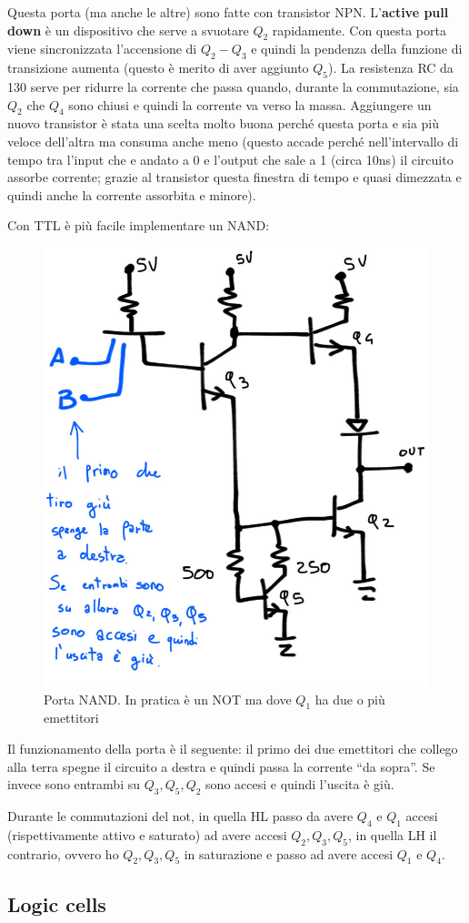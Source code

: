 \documentclass[
]{book}
\begin{document}
Questa porta (ma anche le altre) sono fatte con transistor NPN.
L'\textbf{active pull down} è un dispositivo che serve a svuotare
\(Q_{2}\) rapidamente. Con questa porta viene sincronizzata l'accensione
di \(Q_{2}-Q_{3}\) e quindi la pendenza della funzione di transizione
aumenta (questo è merito di aver aggiunto \(Q_{5}\)). La resistenza RC
da 130 serve per ridurre la corrente che passa quando, durante la
commutazione, sia \(Q_{2}\) che \(Q_{4}\) sono chiusi e quindi la
corrente va verso la massa. Aggiungere un nuovo transistor è stata una
scelta molto buona perché questa porta e sia più veloce dell'altra ma
consuma anche meno (questo accade perché nell'intervallo di tempo tra
l'input che e andato a 0 e l'output che sale a 1 (circa 10ns) il
circuito assorbe corrente; grazie al transistor questa finestra di tempo
e quasi dimezzata e quindi anche la corrente assorbita e minore).

Con TTL è più facile implementare un NAND:

\begin{figure}
\centering
\includegraphics[width=0.3\linewidth,height=\textheight,keepaspectratio]{immagini/23.jpg}
\caption{Porta NAND. In pratica è un NOT ma dove \(Q_1\) ha due o più
emettitori}
\end{figure}

Il funzionamento della porta è il seguente: il primo dei due emettitori
che collego alla terra spegne il circuito a destra e quindi passa la
corrente ``da sopra''. Se invece sono entrambi su \(Q_{3},Q_{5},Q_{2}\)
sono accesi e quindi l'uscita è giù.

Durante le commutazioni del not, in quella HL passo da avere \(Q_{4}\) e
\(Q_{1}\) accesi (rispettivamente attivo e saturato) ad avere accesi
\(Q_{2},Q_{3},Q_{5}\), in quella LH il contrario, ovvero ho
\(Q_{2},Q_{3},Q_{5}\) in saturazione e passo ad avere accesi \(Q_{1}\) e
\(Q_{4}\).

\subsection{Logic cells}\label{logic-cells}
\end{document}
